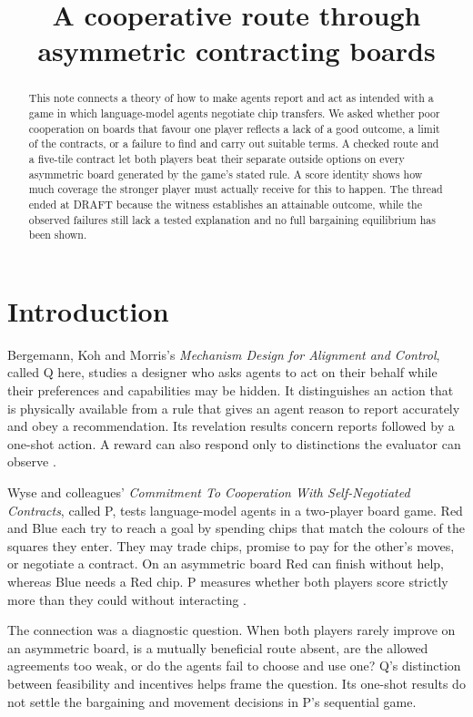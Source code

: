\documentclass{article}
\title{A cooperative route through asymmetric contracting boards}
\begin{document}
\maketitle

\begin{abstract}
This note connects a theory of how to make agents report and act as intended with a game in which
language-model agents negotiate chip transfers. We asked whether poor cooperation on boards that
favour one player reflects a lack of a good outcome, a limit of the contracts, or a failure to find
and carry out suitable terms. A checked route and a five-tile contract let both players beat their
separate outside options on every asymmetric board generated by the game's stated rule. A score
identity shows how much coverage the stronger player must actually receive for this to happen. The
thread ended at DRAFT because the witness establishes an attainable outcome, while the observed
failures still lack a tested explanation and no full bargaining equilibrium has been shown.
\end{abstract}

\section{Introduction}

Bergemann, Koh and Morris's \emph{Mechanism Design for Alignment and Control}, called Q here,
studies a designer who asks agents to act on their behalf while their preferences and capabilities
may be hidden. It distinguishes an action that is physically available from a rule that gives an
agent reason to report accurately and obey a recommendation. Its revelation results concern reports
followed by a one-shot action. A reward can also respond only to distinctions the evaluator can
observe \cite{Q}.

Wyse and colleagues' \emph{Commitment To Cooperation With Self-Negotiated Contracts}, called P,
tests language-model agents in a two-player board game. Red and Blue each try to reach a goal by
spending chips that match the colours of the squares they enter. They may trade chips, promise to
pay for the other's moves, or negotiate a contract. On an asymmetric board Red can finish without
help, whereas Blue needs a Red chip. P measures whether both players score strictly more than they
could without interacting \cite{P}.

The connection was a diagnostic question. When both players rarely improve on an asymmetric board,
is a mutually beneficial route absent, are the allowed agreements too weak, or do the agents fail to
choose and use one? Q's distinction between feasibility and incentives helps frame the question. Its
one-shot results do not settle the bargaining and movement decisions in P's sequential game.
\end{document}
